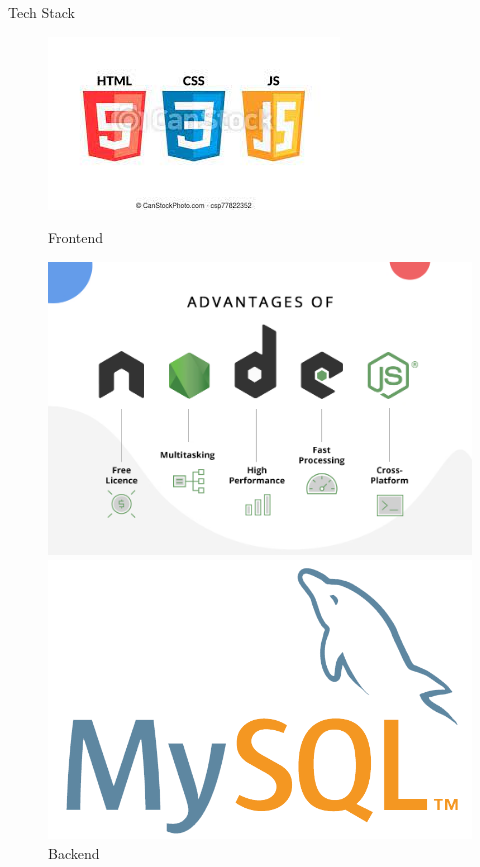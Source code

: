 \documentclass{beamer}
\begin{document}
\begin{frame}{Tech Stack}
    \begin{figure}
        \begin{minipage}[t]{0.2\textwidth}
            \centering
            \includegraphics[width=\textwidth]{frontend.jpeg}
            \caption{Frontend}
        \end{minipage}\hfill
        \begin{minipage}[t]{0.2\textwidth}
            \centering
            \includegraphics[width=\textwidth]{node.js_backend.png}
            \caption{Backend}
        \end{minipage}\hfill
        \begin{minipage}[t]{0.2\textwidth}
            \centering
            \includegraphics[width=\textwidth]{MySQL.png}

\end{minipage}
\end{figure}
\end{frame}
\end{document}
